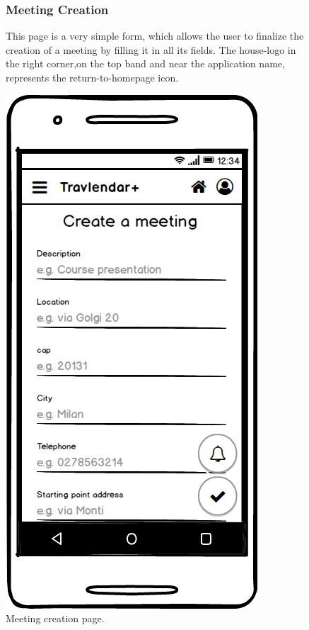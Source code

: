 	\begin{figure}
			\begin{flushleft}
			\subsubsection{Meeting Creation}
			This page is a very simple form, which allows the user to finalize the creation of a meeting by filling it in all its fields. 
			The house-logo in the  right corner,on the top band and near the application name, represents the return-to-homepage icon. 
		\end{flushleft}
		\centering
		\includegraphics[width=0.6\linewidth]{mockups/CreateMeeting}
		\caption{Meeting creation page.}
		\label{fig:createmeeting}
	\end{figure}

